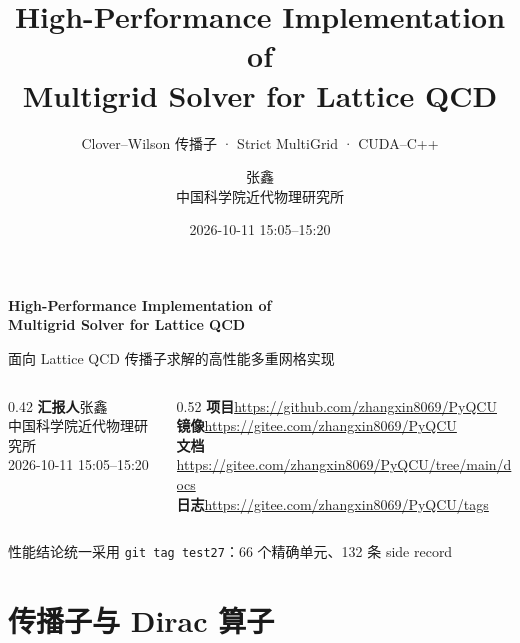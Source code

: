\documentclass[UTF8,aspectratio=169,11pt,fontset=none]{ctexbeamer}
\title[High-Performance MultiGrid]{High-Performance Implementation of\\
Multigrid Solver for Lattice QCD}
\subtitle{Clover--Wilson 传播子 · Strict MultiGrid · CUDA--C++}
\author[张鑫]{张鑫\\中国科学院近代物理研究所}
\date{2026-10-11 15:05--15:20}
\begin{document}
\begin{frame}[plain]
  \vspace{0.2cm}
  {
  \LARGE\bfseries High-Performance Implementation of\\
  Multigrid Solver for Lattice QCD\par}
  \vspace{0.45cm}
  {\large 面向 Lattice QCD 传播子求解的高性能多重网格实现\par}
  \vspace{0.9cm}
  \begin{columns}[T]
    \begin{column}{0.42\textwidth}
      \textbf{汇报人}\quad 张鑫\\
      中国科学院近代物理研究所\\
      2026-10-11 15:05--15:20
    \end{column}
    \begin{column}{0.52\textwidth}
      \textbf{项目}\quad \url{https://github.com/zhangxin8069/PyQCU}\\
      \textbf{镜像}\quad \url{https://gitee.com/zhangxin8069/PyQCU}\\
      \textbf{文档}\quad \url{https://gitee.com/zhangxin8069/PyQCU/tree/main/docs}\\
      \textbf{日志}\quad \url{https://gitee.com/zhangxin8069/PyQCU/tags}
    \end{column}
  \end{columns}
  \vfill
  \centering
  \small 性能结论统一采用 \texttt{git tag test27}：66 个精确单元、132 条 side record
\end{frame}

\section{传播子与 Dirac 算子}
\end{document}
